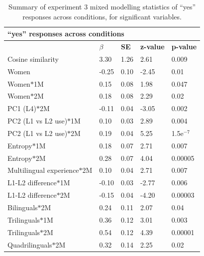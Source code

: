 \begin{table}[!htbp]
    \begin{center}
        \begin{tabular}{@{}lllll@{}}
            \toprule
            \multicolumn{5}{l}{\textbf{``yes'' responses across conditions}} \\ \midrule
            & \textbf{$\beta$} & \textbf{SE} & \textbf{z-value} & \textbf{p-value} \\ \midrule
            Cosine similarity & 3.30 & 1.26 & 2.61 & 0.009 \\ \midrule
            Women & -0.25 & 0.10 & -2.45 & 0.01 \\ \midrule
            Women$\ast$1M & 0.15 & 0.08 & 1.98 & 0.047 \\ \midrule
            Women$\ast$2M & 0.18 & 0.08 & 2.29 & 0.02 \\ \midrule
            PC1 (L4)$\ast$2M & -0.11 & 0.04 & -3.05 & 0.002 \\ \midrule
            PC2 (L1 vs L2 use)$\ast$1M & 0.10 & 0.03 & 2.89 & 0.004 \\ \midrule
            PC2 (L1 vs L2 use)$\ast$2M & 0.19 & 0.04 & 5.25 & 1.5e$^{-7}$ \\ \midrule
            Entropy$\ast$1M & 0.18 & 0.07 & 2.71 & 0.007 \\ \midrule
            Entropy$\ast$2M & 0.28 & 0.07 & 4.04 & 0.00005 \\ \midrule
            Multilingual experience$\ast$2M & 0.10 & 0.04 & 2.71 & 0.007 \\ \midrule
            L1-L2 difference$\ast$1M & -0.10 & 0.03 & -2.77 & 0.006 \\ \midrule
            L1-L2 difference$\ast$2M & -0.15 & 0.04 & -4.20 & 0.00003 \\ \midrule
            Bilinguals$\ast$2M & 0.24 & 0.11 & 2.07 & 0.04 \\ \midrule
            Trilinguals$\ast$1M & 0.36 & 0.12 & 3.01 & 0.003 \\ \midrule
            Trilinguals$\ast$2M & 0.54 & 0.12 & 4.39 & 0.00001 \\ \midrule
            Quadrilinguals$\ast$2M & 0.32 & 0.14 & 2.25 & 0.02 \\ \midrule
            \bottomrule
        \end{tabular}
    \end{center}
    \caption{Summary of experiment 3 mixed modelling statistics of ``yes'' responses across conditions, for significant variables.}
    \label{exp3_yes_summary}
\end{table}
\break

